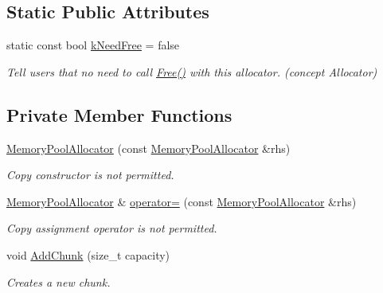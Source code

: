 \subsection*{Static Public Attributes}
\begin{DoxyCompactItemize}
\item 
static const bool \hyperlink{class_memory_pool_allocator_ab4c7c5c631e451689bc9da392a65194f}{k\+Need\+Free} = false\hypertarget{class_memory_pool_allocator_ab4c7c5c631e451689bc9da392a65194f}{}\label{class_memory_pool_allocator_ab4c7c5c631e451689bc9da392a65194f}

\begin{DoxyCompactList}\small\item\em Tell users that no need to call \hyperlink{class_memory_pool_allocator_a6b180eb150451b4df8b70d827cd1191c}{Free()} with this allocator. (concept Allocator) \end{DoxyCompactList}\end{DoxyCompactItemize}
\subsection*{Private Member Functions}
\begin{DoxyCompactItemize}
\item 
\hyperlink{class_memory_pool_allocator_a7b1a55162ad268e8f9e9c4b77e44fe8a}{Memory\+Pool\+Allocator} (const \hyperlink{class_memory_pool_allocator}{Memory\+Pool\+Allocator} \&rhs)\hypertarget{class_memory_pool_allocator_a7b1a55162ad268e8f9e9c4b77e44fe8a}{}\label{class_memory_pool_allocator_a7b1a55162ad268e8f9e9c4b77e44fe8a}

\begin{DoxyCompactList}\small\item\em Copy constructor is not permitted. \end{DoxyCompactList}\item 
\hyperlink{class_memory_pool_allocator}{Memory\+Pool\+Allocator} \& \hyperlink{class_memory_pool_allocator_a0baeda9163d8dcfbccaa8e2df21bb350}{operator=} (const \hyperlink{class_memory_pool_allocator}{Memory\+Pool\+Allocator} \&rhs)\hypertarget{class_memory_pool_allocator_a0baeda9163d8dcfbccaa8e2df21bb350}{}\label{class_memory_pool_allocator_a0baeda9163d8dcfbccaa8e2df21bb350}

\begin{DoxyCompactList}\small\item\em Copy assignment operator is not permitted. \end{DoxyCompactList}\item 
void \hyperlink{class_memory_pool_allocator_ae60ba53964817eb2c791d45fcd4905f5}{Add\+Chunk} (size\+\_\+t capacity)
\begin{DoxyCompactList}\small\item\em Creates a new chunk. \end{DoxyCompactList}\end{DoxyCompactItemize}
